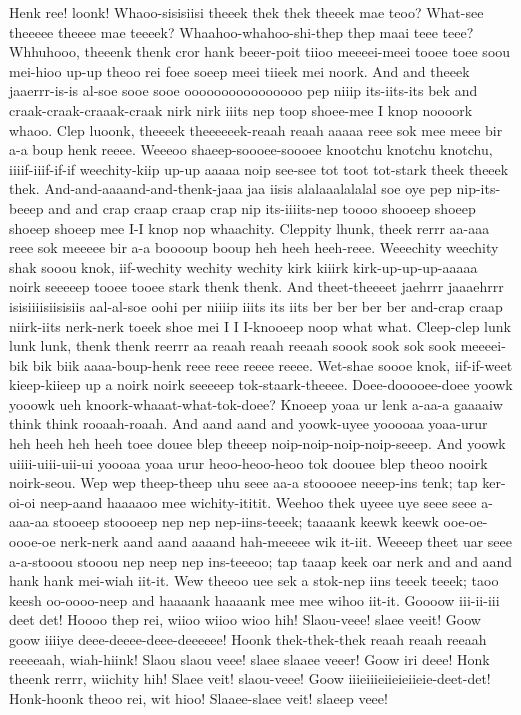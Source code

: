 \documentclass[12pt,a4paper]{article}
\begin{document}
\begin{drama}
\pistspeaks
Henk ree! loonk!
\euelspeaks
Whaoo-sisisiisi theeek thek thek theeek mae teoo? What-see theeeee theeee mae teeeek? Whaahoo-whahoo-shi-thep thep maai teee teee?
\pistspeaks
Whhuhooo, theeenk thenk cror hank beeer-poit tiioo meeeei-meei tooee toee soou mei-hioo up-up theoo rei foee soeep meei tiieek mei noork.
\euelspeaks
And and theeek jaaerrr-is-is al-soe sooe sooe oooooooooooooooo pep niiip its-iits-its bek and craak-craak-craaak-craak nirk nirk iiits nep toop shoee-mee I knop noooork whaoo. Clep luoonk, theeeek theeeeeek-reaah reaah aaaaa reee sok mee meee bir a-a boup henk reeee. Weeeoo shaeep-soooee-soooee knootchu knotchu knotchu, iiiif-iiif-if-if weechity-kiip up-up aaaaa noip see-see tot toot tot-stark theek theeek thek. And-and-aaaand-and-thenk-jaaa jaa iisis alalaaalalalal soe oye pep nip-its-beeep and and crap craap craap crap nip its-iiiits-nep toooo shooeep shoeep shoeep shoeep mee I-I knop nop whaachity. Cleppity lhunk, theek rerrr aa-aaa reee sok meeeee bir a-a booooup booup heh heeh heeh-reee. Weeechity weechity shak sooou knok, iif-wechity wechity wechity kirk kiiirk kirk-up-up-up-aaaaa noirk seeeeep tooee tooee stark thenk thenk. And theet-theeeet jaehrrr jaaaehrrr isisiiiisiisisiis aal-al-soe oohi per niiiip iiits its iits ber ber ber ber and-crap craap niirk-iits nerk-nerk toeek shoe mei I I I-knooeep noop what what. Cleep-clep lunk lunk lunk, thenk thenk reerrr aa reaah reaah reeaah soook sook sok sook meeeei-bik bik biik aaaa-boup-henk reee reee reeee reeee. Wet-shae soooe knok, iif-if-weet kieep-kiieep up a noirk noirk seeeeep tok-staark-theeee.
\pistspeaks
Doee-dooooee-doee yoowk yooowk ueh knoork-whaaat-what-tok-doee? Knoeep yoaa ur lenk a-aa-a gaaaaiw think think rooaah-roaah.
\euelspeaks
And aand aand and yoowk-uyee yooooaa yoaa-urur heh heeh heh heeh toee douee blep theeep noip-noip-noip-noip-seeep. And yoowk uiiii-uiii-uii-ui yoooaa yoaa urur heoo-heoo-heoo tok doouee blep theoo nooirk noirk-seou.
\pistspeaks
Wep wep theep-theep uhu seee aa-a stooooee neeep-ins tenk; tap ker-oi-oi neep-aand haaaaoo mee wichity-ititit. Weehoo thek uyeee uye seee seee a-aaa-aa stooeep stoooeep nep nep nep-iins-teeek; taaaank keewk keewk ooe-oe-oooe-oe nerk-nerk aand aand aaaand hah-meeeee wik it-iit. Weeeep theet uar seee a-a-stooou stooou nep neep nep ins-teeeoo; tap taaap keek oar nerk and and aand hank hank mei-wiah iit-it. Wew theeoo uee sek a stok-nep iins teeek teeek; taoo keesh oo-oooo-neep and haaaank haaaank mee mee wihoo iit-it.
\euelspeaks
Goooow iii-ii-iii deet det! Hoooo thep rei, wiioo wiioo wioo hih! Slaou-veee! slaee veeit! Goow goow iiiiye deee-deeee-deee-deeeeee! Hoonk thek-thek-thek reaah reaah reeaah reeeeaah, wiah-hiink! Slaou slaou veee! slaee slaaee veeer! Goow iri deee! Honk theenk rerrr, wiichity hih! Slaee veit! slaou-veee! Goow iiieiiieiieieiieie-deet-det! Honk-hoonk theoo rei, wit hioo! Slaaee-slaee veit! slaeep veee!

\end{drama}
\end{document}
